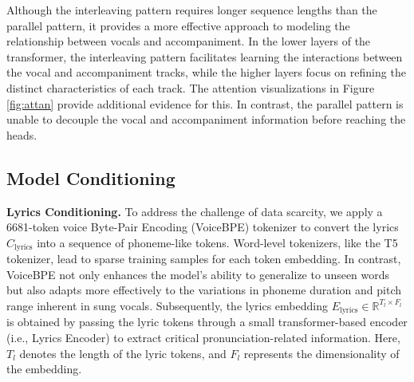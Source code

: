 Although the interleaving pattern requires longer sequence lengths than the parallel pattern, it provides a more effective approach to modeling the relationship between vocals and accompaniment. In the lower layers of the transformer, the interleaving pattern facilitates learning the interactions between the vocal and accompaniment tracks, while the higher layers focus on refining the distinct characteristics of each track. The attention visualizations in Figure \ref{fig:attan} provide additional evidence for this. In contrast, the parallel pattern is unable to decouple the vocal and accompaniment information before reaching the heads.














\subsection{Model Conditioning}
\label{sec:cond_model}
\textbf{Lyrics Conditioning.}
To address the challenge of data scarcity, we apply a 6681-token voice Byte-Pair Encoding (VoiceBPE) tokenizer \cite{casanova2024xtts} to convert the lyrics $C_{\text{lyrics}}$ into a sequence of phoneme-like tokens. Word-level tokenizers, like the T5\cite{raffel2020T5} tokenizer, lead to sparse training samples for each token embedding. In contrast, VoiceBPE not only enhances the model's ability to generalize to unseen words but also adapts more effectively to the variations in phoneme duration and pitch range inherent in sung vocals. Subsequently, the lyrics embedding $E_{\text{lyrics}} \in \mathbb{R}^{T_l \times F_l}$ is obtained by passing the lyric tokens through a small transformer-based encoder (i.e., Lyrics Encoder) to extract critical pronunciation-related information. Here, $T_l$ denotes the length of the lyric tokens, and $F_l$ represents the dimensionality of the embedding.



